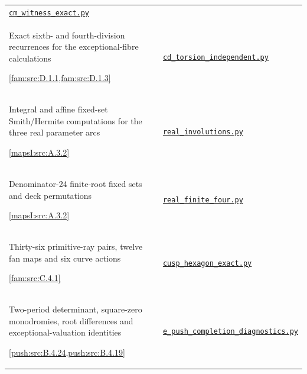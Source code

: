 {\begin{longtable}{@{}>{\raggedright\arraybackslash}p{}>{\raggedright\arraybackslash}p{}@{}}
\href{https://raw.githubusercontent.com/KokunoYumeto/s6-complex-structure-workbench/\SsixRepositoryCommit/pro_returns/S6_SERIES_GRIND_checkpoint_10_20261120T0211Z/code/current_audits/audit_paper_i/arithmetic_06/cm_witness_exact.py}{\nolinkurl{cm_witness_exact.py}} \\[3pt]
Exact sixth- and fourth-division recurrences for the exceptional-fibre calculations\par \cref{fam:src:D.1.1,fam:src:D.1.3} &
\href{https://raw.githubusercontent.com/KokunoYumeto/s6-complex-structure-workbench/\SsixRepositoryCommit/pro_returns/S6_10_PAPERS_checkpoint_15_20261119T1045Z/S6_10_PAPERS/code/I/replay_family_applications/cd_torsion_independent.py}{\nolinkurl{cd_torsion_independent.py}} \\[3pt]
Integral and affine fixed-set Smith/Hermite computations for the three real parameter arcs\par \cref{mapsI:src:A.3.2} &
\href{https://raw.githubusercontent.com/KokunoYumeto/s6-complex-structure-workbench/\SsixRepositoryCommit/pro_returns/S6_10_PAPERS_checkpoint_15_20261119T1045Z/S6_10_PAPERS/code/I/replay_maps/real_involutions.py}{\nolinkurl{real_involutions.py}} \\[3pt]
Denominator-24 finite-root fixed sets and deck permutations\par \cref{mapsI:src:A.3.2} &
\href{https://raw.githubusercontent.com/KokunoYumeto/s6-complex-structure-workbench/\SsixRepositoryCommit/pro_returns/S6_10_PAPERS_checkpoint_15_20261119T1045Z/S6_10_PAPERS/code/I/replay_maps/real_finite_four.py}{\nolinkurl{real_finite_four.py}} \\[3pt]
Thirty-six primitive-ray pairs, twelve fan maps and six curve actions\par \cref{fam:src:C.4.1} &
\href{https://raw.githubusercontent.com/KokunoYumeto/s6-complex-structure-workbench/\SsixRepositoryCommit/pro_returns/S6_SERIES_GRIND_checkpoint_10_20261120T0211Z/code/current_audits/audit_paper_i/code/cusp_hexagon_exact.py}{\nolinkurl{cusp_hexagon_exact.py}} \\[3pt]
Two-period determinant, square-zero monodromies, root differences and exceptional-valuation identities\par \cref{push:src:B.4.24,push:src:B.4.19} &
\href{https://raw.githubusercontent.com/KokunoYumeto/s6-complex-structure-workbench/\SsixRepositoryCommit/pro_returns/S6_02_PUSH_final_20261115T2217Z/S6_02_PUSH/code/e_push_completion_diagnostics.py}{\nolinkurl{e_push_completion_diagnostics.py}} \\[3pt]

\end{longtable}}

